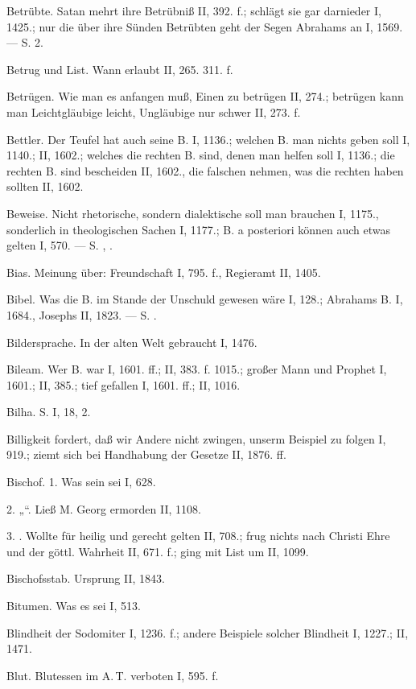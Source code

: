 Betrübte. Satan mehrt ihre Betrübniß II, 392. f.; schlägt sie gar darnieder I, 1425.; nur die über ihre Sünden Betrübten geht der Segen Abrahams an I, 1569. — S.  2.

Betrug und List. Wann erlaubt II, 265. 311. f.

Betrügen. Wie man es anfangen muß, Einen zu betrügen II, 274.; betrügen kann man Leichtgläubige leicht, Ungläubige nur schwer II, 273. f.

Bettler. Der Teufel hat auch seine B. I, 1136.; welchen B. man nichts geben soll I, 1140.; II, 1602.; welches die rechten B. sind, denen man helfen soll I, 1136.; die rechten B. sind bescheiden II, 1602., die falschen nehmen, was die rechten haben sollten II, 1602.

Beweise. Nicht rhetorische, sondern dialektische soll man brauchen I, 1175., sonderlich in theologischen Sachen I, 1177.; B. a posteriori können auch etwas gelten I, 570. — S. , .

Bias. Meinung über: Freundschaft I, 795. f., Regieramt II, 1405.

Bibel. Was die B. im Stande der Unschuld gewesen wäre I, 128.; Abrahams B. I, 1684., Josephs II, 1823. — S. .

Bildersprache. In der alten Welt gebraucht I, 1476.

Bileam. Wer B. war I, 1601. ff.; II, 383. f. 1015.; großer Mann und Prophet I, 1601.; II, 385.; tief gefallen I, 1601. ff.; II, 1016.

Bilha. S.  I, 18,  2.

Billigkeit fordert, daß wir Andere nicht zwingen, unserm Beispiel zu folgen I, 919.; ziemt sich bei Handhabung der Gesetze II, 1876. ff.

Bischof. 1. Was sein  sei I, 628.

2. „“. Ließ M. Georg ermorden II, 1108.

3. . Wollte für heilig und gerecht gelten II, 708.; frug nichts nach Christi Ehre und der göttl. Wahrheit II, 671. f.; ging mit List um II, 1099.

Bischofsstab. Ursprung II, 1843.

Bitumen. Was es sei I, 513.

Blindheit der Sodomiter I, 1236. f.; andere Beispiele solcher Blindheit I, 1227.; II, 1471.

Blut. Blutessen im A.\,T. verboten I, 595. f.

